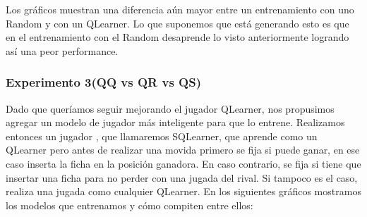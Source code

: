 \documentclass[10pt, a4paper]{article}
\begin{document}
Los gráficos muestran una diferencia aún mayor entre un entrenamiento con uno Random y con un QLearner. Lo que suponemos que está generando esto es que en el entrenamiento con el Random desaprende lo visto anteriormente logrando así una peor performance.


\subsubsection{Experimento 3(QQ vs QR vs QS)}

Dado que queríamos seguir mejorando el jugador QLearner, nos propusimos agregar un modelo de jugador más inteligente para que lo entrene.  Realizamos entonces un jugador , que llamaremos SQLearner, que aprende como un QLearner pero antes de realizar una movida primero se fija si puede ganar, en ese caso inserta la ficha en la posición ganadora. En caso contrario, se fija si tiene que insertar una ficha para no perder con una jugada del rival. Si tampoco es el caso, realiza una jugada como cualquier QLearner.
En los siguientes gráficos mostramos los modelos que entrenamos y cómo compiten entre ellos:
\end{document}
